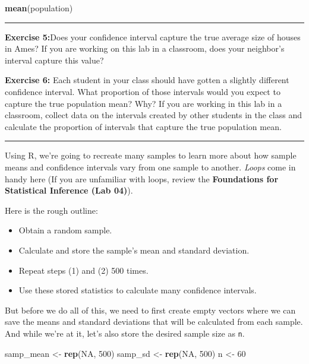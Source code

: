 \documentclass[]{book}
\newenvironment{Shaded}{\begin{snugshade}}{\end{snugshade}}
\newcommand{\KeywordTok}[1]{\textcolor[rgb]{0.13,0.29,0.53}{\textbf{#1}}}
\newcommand{\DecValTok}[1]{\textcolor[rgb]{0.00,0.00,0.81}{#1}}
\newcommand{\StringTok}[1]{\textcolor[rgb]{0.31,0.60,0.02}{#1}}
\newcommand{\OtherTok}[1]{\textcolor[rgb]{0.56,0.35,0.01}{#1}}
\newcommand{\NormalTok}[1]{#1}
\providecommand{\tightlist}{%
  \setlength{\itemsep}{0pt}\setlength{\parskip}{0pt}}
\theoremstyle{definition}
\theoremstyle{definition}
\theoremstyle{definition}
\theoremstyle{remark}
\begin{document}
\begin{Shaded}
\begin{Highlighting}[]
\KeywordTok{mean}\NormalTok{(population)}
\end{Highlighting}
\end{Shaded}

\begin{center}\rule{0.5\linewidth}{\linethickness}\end{center}

\textbf{Exercise 5:}Does your confidence interval capture the true
average size of houses in Ames? If you are working on this lab in a
classroom, does your neighbor's interval capture this value?

\textbf{Exercise 6:} Each student in your class should have gotten a
slightly different confidence interval. What proportion of those
intervals would you expect to capture the true population mean? Why? If
you are working in this lab in a classroom, collect data on the
intervals created by other students in the class and calculate the
proportion of intervals that capture the true population mean.

\begin{center}\rule{0.5\linewidth}{\linethickness}\end{center}

Using R, we're going to recreate many samples to learn more about how
sample means and confidence intervals vary from one sample to another.
\emph{Loops} come in handy here (If you are unfamiliar with loops,
review the \textbf{Foundations for Statistical Inference (Lab 04)}).

Here is the rough outline:

\begin{itemize}
\tightlist
\item
  Obtain a random sample.
\item
  Calculate and store the sample's mean and standard deviation.
\item
  Repeat steps (1) and (2) 500 times.
\item
  Use these stored statistics to calculate many confidence intervals.
\end{itemize}

But before we do all of this, we need to first create empty vectors
where we can save the means and standard deviations that will be
calculated from each sample. And while we're at it, let's also store the
desired sample size as \texttt{n}.

\begin{Shaded}
\begin{Highlighting}[]
\NormalTok{samp_mean <-}\StringTok{ }\KeywordTok{rep}\NormalTok{(}\OtherTok{NA}\NormalTok{, }\DecValTok{500}\NormalTok{)}
\NormalTok{samp_sd <-}\StringTok{ }\KeywordTok{rep}\NormalTok{(}\OtherTok{NA}\NormalTok{, }\DecValTok{500}\NormalTok{)}
\NormalTok{n <-}\StringTok{ }\DecValTok{60}
\end{Highlighting}
\end{Shaded}
\end{document}
